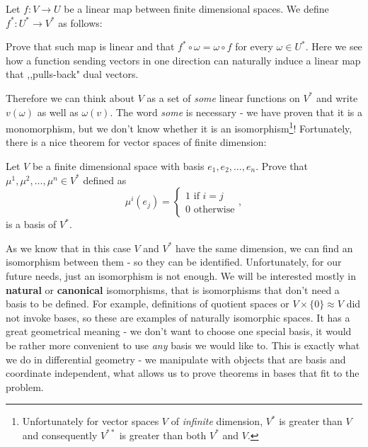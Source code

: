 \begin{prob}
  Let $f : V\to U$ be a linear map between finite dimensional spaces. We define $f^*:U^*\to V^*$ as follows:
  \begin{figure}
    \centering
  \end{figure}
  Prove that such map is linear and that $f^*\circ \omega = \omega\circ f$ for every $\omega\in U^*$. Here we see how a function sending vectors in one direction can naturally
  induce a linear map that ,,pulls-back" dual vectors.
\end{prob}

Therefore we can think about $V$ as a set of \textit{some} linear functions on $V^*$ and write $v(\omega)$ as well as $\omega(v)$. The word \textit{some} is necessary -
we have proven that it is a monomorphism, but we don't know whether it is an isomorphism\footnote{Unfortunately for vector spaces $V$ of \textit{infinite} dimension, $V^*$ is greater than $V$ and consequently $V^{**}$ is greater than both $V^*$ and $V$.}! Fortunately, there is a nice theorem for vector spaces of finite dimension:

\begin{prob}
  Let $V$ be a finite dimensional space with basis $e_1,e_2,\dots,e_n$. Prove that $\mu^1, \mu^2,\dots,\mu^n\in V^*$ defined as
    $$\mu^i(e_j)=\begin{cases}1 \text{ if } i=j\\ 0 \text{ otherwise}\end{cases},$$
  is a basis of $V^*$.
\end{prob}

As we know that in this case $V$ and $V^*$ have the same dimension, we can find an isomorphism between them - so they can be identified.
Unfortunately, for our future needs, just an isomorphism is not enough. We will be interested mostly in \textbf{natural} or \textbf{canonical} isomorphisms, that
is isomorphisms that don't need a basis to be defined. For example, definitions of quotient spaces or $V\times \{0\}\approx V$ did not invoke bases, so these are examples of naturally
isomorphic spaces. It has a great geometrical meaning - we don't want to choose one special basis, it would be rather more convenient to use \textit{any} basis we would like to.
This is exactly what we do in differential geometry - we manipulate with objects that are basis and coordinate independent, what allows us to prove theorems in bases that fit to
the problem.

